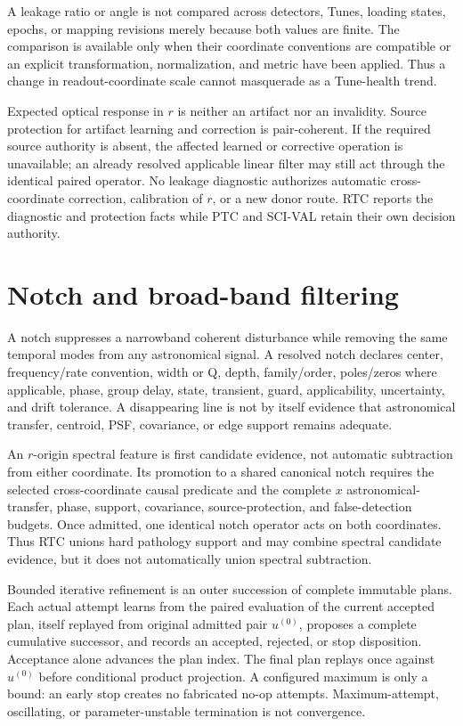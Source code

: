 \documentclass[10pt]{article}
\begin{document}
A leakage ratio or angle is not compared across detectors, Tunes, loading
states, epochs, or mapping revisions merely because both values are finite.
The comparison is available only when their coordinate conventions are
compatible or an explicit transformation, normalization, and metric have been
applied.  Thus a change in readout-coordinate scale cannot masquerade as a
Tune-health trend.

Expected optical response in $r$ is neither an artifact nor an invalidity.
Source protection for artifact learning and correction is pair-coherent.  If
the required source authority is absent, the affected learned or corrective
operation is unavailable; an already resolved applicable linear filter may
still act through the identical paired operator.  No leakage diagnostic authorizes automatic
cross-coordinate correction, calibration of $r$, or a new donor route.  RTC
reports the diagnostic and protection facts while PTC and SCI-VAL retain their
own decision authority.

\section{Notch and broad-band filtering}
\label{sec:rat-filter-classes}
A notch suppresses a narrowband coherent disturbance while removing the same
temporal modes from any astronomical signal.  A resolved notch declares
center, frequency/rate convention, width or Q, depth, family/order,
poles/zeros where applicable, phase, group delay, state, transient, guard,
applicability, uncertainty, and drift tolerance.  A disappearing line is not
by itself evidence that astronomical transfer, centroid, PSF, covariance, or
edge support remains adequate.

An $r$-origin spectral feature is first candidate evidence, not automatic
subtraction from either coordinate.  Its promotion to a shared canonical
notch requires the selected cross-coordinate causal predicate and the complete
$x$ astronomical-transfer, phase, support, covariance, source-protection, and
false-detection budgets.  Once admitted, one identical notch operator acts on
both coordinates.  Thus RTC unions hard pathology support and may combine
spectral candidate evidence, but it does not automatically union spectral
subtraction.

Bounded iterative refinement is an outer succession of complete immutable
plans.  Each actual attempt learns from the paired evaluation of the current
accepted plan, itself replayed from original admitted pair $u^{(0)}$, proposes
a complete cumulative successor, and records an
accepted, rejected, or stop disposition.  Acceptance alone advances the plan
index.  The final plan replays once against $u^{(0)}$ before conditional
product projection.  A
configured maximum is only a bound: an early stop creates no fabricated no-op
attempts.  Maximum-attempt, oscillating, or parameter-unstable termination is
not convergence.
\end{document}
